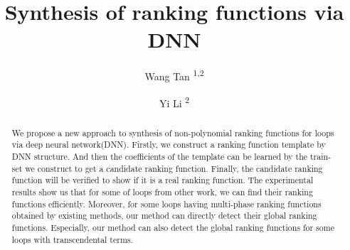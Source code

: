 %
%
%
%



\title{Synthesis of ranking functions via DNN%
}


\author{Wang Tan \textsuperscript{1,2}     \and
	Yi Li  \textsuperscript{2} 
}






\maketitle

\begin{abstract}
We propose a new approach to synthesis of non-polynomial ranking functions for loops via deep neural network(DNN). Firstly, we construct a ranking function template by DNN structure. And then the coefficients of the template can be learned by the train-set we construct to get a candidate ranking function. Finally, the candidate ranking function  will be verified to show if it is a real ranking function. The experimental results show us that for some of loops from other work, we can find their ranking functions efficiently. Moreover, for some loops having multi-phase ranking functions obtained by existing methods, our method can directly detect their global ranking functions. Especially, our method can also detect the global ranking functions for some loops with transcendental terms.
\end{abstract}

